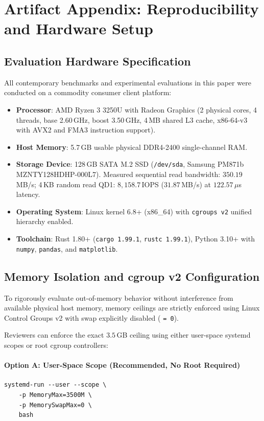 \section{Artifact Appendix: Reproducibility and Hardware Setup}
\label{sec:appendix_artifact}

\subsection{Evaluation Hardware Specification}
All contemporary benchmarks and experimental evaluations in this paper were conducted on a commodity consumer client platform:
\begin{itemize}
    \item \textbf{Processor}: AMD Ryzen 3 3250U with Radeon Graphics (2 physical cores, 4 threads, base 2.60\,GHz, boost 3.50\,GHz, 4\,MB shared L3 cache, x86-64-v3 with AVX2 and FMA3 instruction support).
    \item \textbf{Host Memory}: 5.7\,GB usable physical DDR4-2400 single-channel RAM.
    \item \textbf{Storage Device}: 128\,GB SATA M.2 SSD (\texttt{/dev/sda}, Samsung PM871b MZNTY128HDHP-000L7). Measured sequential read bandwidth: $350.19$\,MB/s; 4\,KB random read QD1: $8,158.7$\,IOPS ($31.87$\,MB/s) at $122.57\,\mu$s latency.
    \item \textbf{Operating System}: Linux kernel 6.8+ (x86\_64) with \texttt{cgroups v2} unified hierarchy enabled.
    \item \textbf{Toolchain}: Rust 1.80+ (\texttt{cargo 1.99.1}, \texttt{rustc 1.99.1}), Python 3.10+ with \texttt{numpy}, \texttt{pandas}, and \texttt{matplotlib}.
\end{itemize}

\subsection{Memory Isolation and cgroup v2 Configuration}
To rigorously evaluate out-of-memory behavior without interference from available physical host memory, memory ceilings are strictly enforced using Linux Control Groups v2 with swap explicitly disabled ( \texttt{= 0}).

Reviewers can enforce the exact $3.5$\,GB ceiling using either user-space systemd scopes or root cgroup controllers:

\paragraph{Option A: User-Space Scope (Recommended, No Root Required)}
\begin{small}
\begin{verbatim}
systemd-run --user --scope \
    -p MemoryMax=3500M \
    -p MemorySwapMax=0 \
    bash
\end{verbatim}
\end{small}

